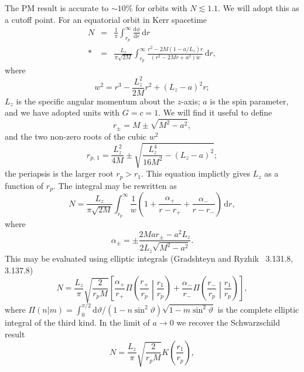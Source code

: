 \documentclass[aps,prd,amsfonts,amssymb,amsmath,nofootinbib,floatfix,reprint,showpacs,groupedaddress]{revtex4-1}
\newcommand{\dd}{\ensuremath{\mathrm{d}}}
\newcommand{\diff}[2]{\ensuremath{\frac{\dd {#1}}{\dd {#2}}}}
\newcommand{\intd}[4]{\ensuremath{\int_{#1}^{#2}{#3}\,\dd{#4}}}
\newcommand{\recip}[1]{\ensuremath{\frac{1}{#1}}}
\begin{document}
The PM result is accurate to $\sim 10\%$ for orbits with $N \lesssim 1.1$. We will adopt this as a cutoff point. For an equatorial orbit in Kerr spacetime
\begin{eqnarray}
N & = & \recip{\pi}\intd{r_{p}}{\infty}{\diff{\phi}{r}}{r} \nonumber \\*
 & = & \frac{L_z}{\pi\sqrt{2M}}\intd{r_{p}}{\infty}{\frac{r^2 - 2M(1 - a/L_z)r}{(r^2 - 2Mr + a^2)w}}{r},
\end{eqnarray}
where
\begin{equation}
w^2 = r^3 - \frac{L_z^2}{2M}r^2 + (L_z - a)^2r;
\end{equation}
$L_z$ is the specific angular momentum about the $z$-axis; $a$ is the spin parameter, and we have adopted units with $G = c = 1$. We will find it useful to define
\begin{equation}
r_\pm = M \pm \sqrt{M^2 - a^2},
\end{equation}
and the two non-zero roots of the cubic $w^2$
\begin{equation}
r_{p,\,1} = \frac{L_z^2}{4M} \pm \sqrt{\frac{L_z^4}{16M^2} - (L_z -a)^2};
\end{equation}
the periapsis is the larger root $r_{p} > r_1$. This equation implictly gives $L_z$ as a function of $r_p$. The integral may be rewritten as
\begin{equation}
N = \frac{L_z}{\pi\sqrt{2M}}\intd{r_{p}}{\infty}{\recip{w}\left(1 + \frac{\alpha_+}{r-r_+} + \frac{\alpha_-}{r-r_-}\right)}{r},
\end{equation}
where
\begin{equation}
\alpha_\pm = \pm\frac{2Mar_\pm - a^2L_z}{2L_z\sqrt{M^2-a^2}}.
\end{equation}
This may be evaluated using elliptic integrals (Gradshteyn and Ryzhik~\cite{Gradshteyn2000} 3.131.8, 3.137.8)
\begin{equation}
N = \frac{L_z}{\pi}\sqrt{\frac{2}{r_{p}M}}\left[\frac{\alpha_+}{r_+}\Pi\left(\frac{r_+}{r_{p}}\middle|\frac{r_1}{r_{p}}\right) + \frac{\alpha_-}{r_-}\Pi\left(\frac{r_-}{r_{p}}\middle|\frac{r_1}{r_{p}}\right)\right],
\end{equation}
where $\Pi(n|m) = \int_{0}^{\pi/2}{\dd\vartheta/(1-n\sin^2\vartheta)\sqrt{1-m\sin^2\vartheta}}$ is the complete elliptic integral of the third kind. In the limit of $a \rightarrow 0$ we recover the Schwarzschild result~\cite{Cutler1994}
\begin{equation}
N = \frac{L_z}{\pi}\sqrt{\frac{2}{r_{p}M}}K\left(\frac{r_1}{r_{p}}\right),
\end{equation}
\end{document}
